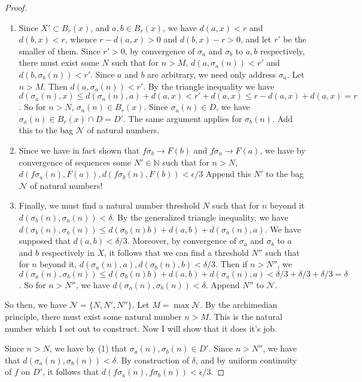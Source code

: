\documentclass[11pt]{article}
\newcommand{\N}{\mathbb{N}}
\theoremstyle{definition}
\begin{document}
\begin{proof}
\begin{enumerate}
\item Since $ X'\subset B_r(x) $, and $a,b\in B_r(x)$, we have $ d(a,x) < r$  and $ d(b,x) < r $, whence $ r - d(a,x) > 0 $ and $ d(b,x) - r > 0$, and let $r'$ be the smaller of them. Since $r' > 0$, by convergence of $\sigma_a$ and $\sigma_b$ to $a,b$ respectively, there must exist some $N$ such that for $n> M$, $d(a,\sigma_a(n) ) < r'$ and $d(b,\sigma_b(n) ) < r'$. Since $a$ and $b$ are arbitrary, we need only address $\sigma_a$. Let $n > M$. Then $d(a, \sigma_a(n) ) < r'$. By the triangle inequality we have $ d(\sigma_a(n) , x) \le d(\sigma_a(n), a) + d(a,x) < r' + d(a,x) \le r - d(a,x) + d(a,x) = r$. So for $n> N$, $ \sigma_a(n) \in B_r(x) $. Since $\sigma_a(n) \in D$, we have $ \sigma_a(n) \in B_r(x)\cap D = D' $. The same argument applies for $\sigma_b(n)$. Add this to the bag $\mathcal{N}$ of natural numbers.
\item Since we have in fact shown that $f\sigma_b \to F(b)$ and $f\sigma_a \to F(a)$, we have by convergence of sequences some $N'\in \N$ such that for $n> N$, $d(f\sigma_a(n) , F(a)), d(f\sigma_b(n), F(b)) < \epsilon /3 $ Append this $N'$ to the bag $ \mathcal{N}$ of natural numbers!
\item Finally, we must find a natural number threshold $N$ such that for $n$ beyond it $d(\sigma_b(n), \sigma_a(n) ) < \delta$. By the generalized triangle inequality, we have $ d(\sigma_b(n), \sigma_a(n) ) \le d(\sigma_b(n) b) + d(a,b) + d(\sigma_a(n), a)$. We have supposed that $d(a,b) < \delta/3$. Moreover, by convergence of $\sigma_a$ and $\sigma_b$ to $a$ and $b$ respectively in $X$, it follows that we can find a threshold $N''$ such that for $n$ beyond it, $d(\sigma_a(n), a ), d(\sigma_b(n), b) < \delta/3$. Then if $n> N''$, we $ d(\sigma_a(n), \sigma_b(n)) \le  d(\sigma_b(n) b) + d(a,b) + d(\sigma_a(n), a) < \delta/3 + \delta/3 + \delta/3 = \delta$. So for $n > N''$, we have $d(\sigma_a(n), \sigma_b(n)) < \delta$. Append $N''$ to $\mathcal{N}$. 
\end{enumerate}

So then, we have $\mathcal{N} = \{N, N', N'' \}$. Let $M = \max\mathcal{N}$. By the archimedian principle, there must exist some natural number $n > M$. This is the natural number which I set out to construct. Now I will show that it does it's job.

Since $n>N$, we have by (1) that $ \sigma_a(n), \sigma_b(n) \in D' $. Since $n> N''$, we have that $ d(\sigma_a(n) , \sigma_b(n)) < \delta $. By construction of $\delta$, and by uniform continuity of $f$ on $D'$, it follows that $ d(f\sigma_a(n) , f\sigma_b(n) ) < \epsilon /3 $. 


\end{proof}
\end{document}
